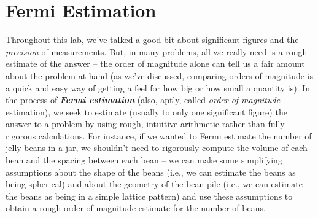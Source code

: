 \documentclass[11pt]{article}
\begin{document}
\bigskip

\section{Fermi Estimation}
Throughout this lab, we've talked a good bit about significant figures and the \emph{precision} of measurements. But, in many problems, all we really need is a rough estimate of the answer -- the order of magnitude alone can tell us a fair amount about the problem at hand (as we've discussed, comparing orders of magnitude is a quick and easy way of getting a feel for how big or how small a quantity is). In the process of \textbf{\emph{Fermi estimation}} (also, aptly, called \emph{order-of-magnitude} estimation), we seek to estimate (usually to only one significant figure) the answer to a problem by using rough, intuitive arithmetic rather than fully rigorous calculations. For instance, if we wanted to Fermi estimate the number of jelly beans in a jar, we shouldn't need to rigorously compute the volume of each bean and the spacing between each bean -- we can make some simplifying assumptions about the shape of the beans (i.e., we can estimate the beans as being spherical) and about the geometry of the bean pile (i.e., we can estimate the beans as being in a simple lattice pattern) and use these assumptions to obtain a rough order-of-magnitude estimate for the number of beans.
\end{document}
